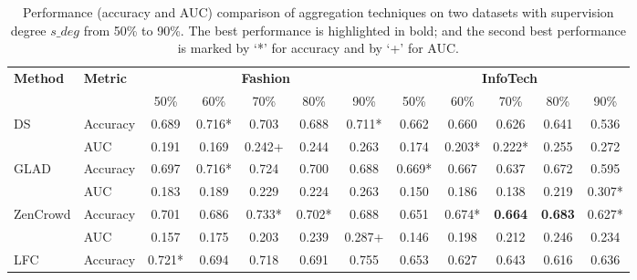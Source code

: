 \begin{table*}[t]
\centering
\caption{Performance (accuracy and AUC) comparison of aggregation techniques on two datasets with supervision degree $s\_deg$ from 50\% to 90\%. The best performance is highlighted in bold; and the second best performance is marked by `*' for accuracy and by `+' for AUC.}\label{tab:comparision} 
\begin{tabular}{ll|ccccc|ccccc}
\toprule
\multirow{2}{*}{\textbf{Method}}  &   \multirow{2}{*}{\textbf{Metric}}  & \multicolumn{5}{|c|}{\textbf{Fashion}}      & \multicolumn{5}{c}{\textbf{InfoTech}} \jie{to update} \\ \cline{3-12}
 & &   50\%           & 60\%           & 70\%           & 80\%           & 90\%           & 50\%           & 60\%           & 70\%           & 80\%           & 90\%           \\ \midrule
\multirow{2}{*}{DS}          & Accuracy     & 0.689          & 0.716*         & 0.703          & 0.688          & 0.711*         & 0.662          & 0.660          & 0.626          & 0.641          & 0.536          \\ %
                             & AUC   & 0.191          & 0.169          & 0.242+          & 0.244          & 0.263          & 0.174          & 0.203*         & 0.222*         & 0.255          & 0.272          \\ \hline
\multirow{2}{*}{GLAD}        & Accuracy     & 0.697          & 0.716*         & 0.724          & 0.700          & 0.688          & 0.669*         & 0.667          & 0.637          & 0.672          & 0.595          \\ %
                             & AUC   & 0.183          & 0.189          & 0.229          & 0.224          & 0.263          & 0.150          & 0.186          & 0.138          & 0.219          & 0.307*         \\ \hline
\multirow{2}{*}{ZenCrowd}                           & Accuracy     & 0.701          & 0.686          & 0.733* & 0.702*         & 0.688          & 0.651          & 0.674*         & \textbf{0.664} & \textbf{0.683} & 0.627*         \\ %
                             & AUC   & 0.157          & 0.175          & 0.203         & 0.239          & 0.287+         & 0.146          & 0.198          & 0.212          & 0.246          & 0.234          \\ \hline
\multirow{2}{*}{LFC}         & Accuracy     & 0.721*         & 0.694          & 0.718          & 0.691          & 0.755          & 0.653          & 0.627          & 0.643          & 0.616          & 0.636          \\ %

\end{tabular}
\end{table*}
